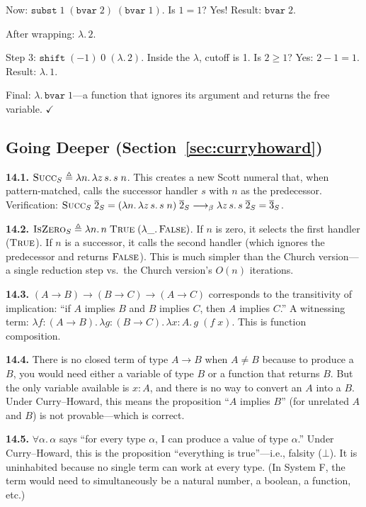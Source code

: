 \documentclass[11pt,a4paper]{article}
\theoremstyle{definition}
\newcommand{\lam}{\lambda}
\newcommand{\reduce}{\longrightarrow_\beta}
\newcommand{\church}[1]{\overline{#1}}
\newcommand{\TR}{\textsc{True}}
\newcommand{\FL}{\textsc{False}}
\begin{document}
Now: $\texttt{subst}\;1\;(\texttt{bvar}\;2)\;(\texttt{bvar}\;1)$. Is $1 = 1$? Yes! Result: $\texttt{bvar}\;2$.

After wrapping: $\lam.\, 2$.

Step 3: $\texttt{shift}\;(-1)\;0\;(\lam.\, 2)$. Inside the $\lam$, cutoff is 1. Is $2 \geq 1$? Yes: $2 - 1 = 1$. Result: $\lam.\, 1$.

Final: $\lam.\, \texttt{bvar}\;1$---a function that ignores its argument and returns the free variable. $\checkmark$

\subsection*{Going Deeper (Section~\ref{sec:curryhoward})}

\textbf{14.1.}\; $\textsc{Succ}_S \triangleq \lam n.\, \lam z\, s.\, s\; n$. This creates a new Scott numeral that, when pattern-matched, calls the successor handler $s$ with $n$ as the predecessor. Verification: $\textsc{Succ}_S\;\church{2}_S = (\lam n.\, \lam z\,s.\, s\;n)\;\church{2}_S \reduce \lam z\,s.\, s\;\church{2}_S = \church{3}_S$.

\medskip
\textbf{14.2.}\; $\textsc{IsZero}_S \triangleq \lam n.\, n\;\TR\;(\lam\_.\, \FL)$. If $n$ is zero, it selects the first handler ($\TR$). If $n$ is a successor, it calls the second handler (which ignores the predecessor and returns $\FL$). This is much simpler than the Church version---a single reduction step vs.\ the Church version's $O(n)$ iterations.

\medskip
\textbf{14.3.}\; $(A \to B) \to (B \to C) \to (A \to C)$ corresponds to the transitivity of implication: ``if $A$ implies $B$ and $B$ implies $C$, then $A$ implies $C$.'' A witnessing term: $\lam f{:}(A \to B).\, \lam g{:}(B \to C).\, \lam x{:}A.\, g\;(f\;x)$. This is function composition.

\medskip
\textbf{14.4.}\; There is no closed term of type $A \to B$ when $A \neq B$ because to produce a $B$, you would need either a variable of type $B$ or a function that returns $B$. But the only variable available is $x : A$, and there is no way to convert an $A$ into a $B$. Under Curry--Howard, this means the proposition ``$A$ implies $B$'' (for unrelated $A$ and $B$) is not provable---which is correct.

\medskip
\textbf{14.5.}\; $\forall \alpha.\, \alpha$ says ``for every type $\alpha$, I can produce a value of type $\alpha$.'' Under Curry--Howard, this is the proposition ``everything is true''---i.e., falsity ($\bot$). It is uninhabited because no single term can work at every type. (In System F, the term would need to simultaneously be a natural number, a boolean, a function, etc.)
\end{document}

